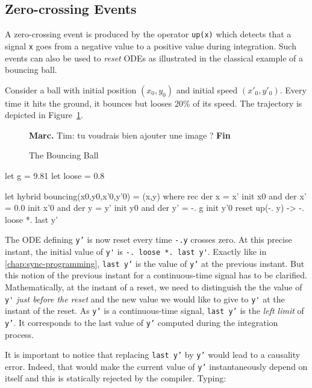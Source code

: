 \documentclass[11pt,titlepage,twoside]{report}
\newcommand{\Marc}[1]{{\bf Marc.} {#1} {\bf Fin}}
\begin{document}
\subsection{Zero-crossing Events} %

A zero-crossing event is produced by the operator \texttt{up(x)}
which detects that a signal \texttt{x} goes from a negative value to a
positive value during integration. Such events can also be used
to \emph{reset} \acp{ODE} as illustrated in the classical example of a 
bouncing ball.

Consider a ball with initial position $(x_0, y_0)$ and initial speed
$(x'_0, y'_0)$. Every time it hits the ground, it bounces but looses
20\% of its speed. The trajectory is depicted in 
Figure~\cref{fig:bouncing-ball}.

\begin{figure}
  \Marc{Tim: tu voudrais bien ajouter une image ?}
\caption{The Bouncing Ball~\label{fig:bouncing-ball}}
\end{figure}

\begin{runverbatim}[label=gravity]
let g = 9.81
let loose = 0.8
\end{runverbatim}
\begin{runverbatim}
let hybrid bouncing(x0,y0,x'0,y'0) = (x,y) where
 rec der x = x' init x0
 and der x' = 0.0 init x'0
 and der y = y' init y0
 and der y' = -. g init y'0 reset up(-. y) -> -. loose *. last y'
\end{runverbatim}

The \ac{ODE} defining \texttt{y'} is now reset every time \texttt{-.y}
crosses zero.  At this precise instant, the initial value of \verb-y'-
is \verb+-. loose *. last y'+. Exactly like in
\cref{chap:sync-programming}, \texttt{last y'} is the
value of \texttt{y'} at the previous instant. But this notion of the
previous instant for a continuous-time signal has to be
clarified. Mathematically, at the instant of a reset, we need to
distinguish the the value of \verb-y'- \emph{just before the reset}
and the new value we would like to give to \verb-y'- at the instant of
the reset. As \texttt{y'} is a continuous-time signal, \texttt{last
  y'} is the \emph{left limit} of \texttt{y'}. It corresponds to the
last value of \texttt{y'} computed during the integration process.

It is important to notice that replacing \texttt{last y'} by
\texttt{y'} would lead to a causality error. Indeed, that would make
the current value of \texttt{y'} instantaneously depend on itself and
this is statically rejected by the compiler. Typing:
\end{document}
